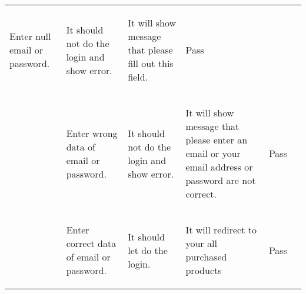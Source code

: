 \documentclass{article}
\begin{document}
\begin{table}[H]
\begin{tabularx}{\textwidth}{|M{2.5cm}|M{4cm}|M{4cm}|M{4cm}|M{1cm}|N}
{\begin{flushleft}
Enter null email or
password.
\end{flushleft}} &
{\begin{flushleft}
It should not do the
login and show error.
\end{flushleft}
} & %
{\begin{flushleft}
It will show message that please fill out this field.
\end{flushleft}} &
Pass & \\[0pt] &
{\begin{flushleft}
Enter wrong data of
email or password.
\end{flushleft}} & 
{\begin{flushleft}
It should not do the login and show error.
\end{flushleft}} & 
{\begin{flushleft}
It will show message that please enter an email or your email address or password are not correct.
\end{flushleft}
} & Pass\\[25pt]& 
{\begin{flushleft}
Enter correct data of
email or password.
\end{flushleft}} & 
{\begin{flushleft}
It should let do the login.
\end{flushleft}
} & 
{\begin{flushleft}
It will redirect to your all purchased products
\end{flushleft}
} & Pass\\ [25pt]
\hline%
%

\end{tabularx}
\end{table}
\end{document}
